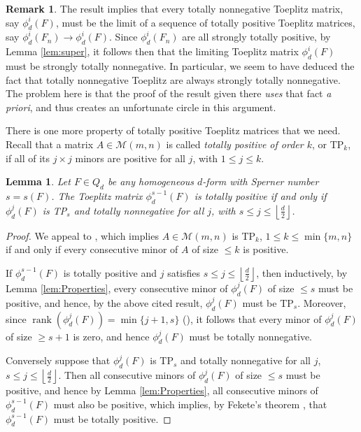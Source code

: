 \documentclass[unnumsec,webpdf,modern,medium]{oup-authoring-template}
\newcommand{\flo}[1]{\left\lfloor\frac{#1}{2}\right\rfloor}
\theoremstyle{theorem}
\newtheorem{lemma}[theorem]{Lemma}
\theoremstyle{definition}
\newtheorem{remark}[theorem]{Remark}
\begin{document}
\begin{remark}
	\label{rem:STNN}
	The result \cite[Theorem 2, Theorem 4.21]{MMS} implies that every totally nonnegative Toeplitz matrix, say $\phi^i_d(F)$, must be the limit of a sequence of totally positive Toeplitz matrices, say $\phi^i_d(F_n)\rightarrow \phi^i_d(F)$.  Since $\phi^i_d(F_n)$ are all strongly totally positive, by Lemma \ref{lem:super}, it follows then that the limiting Toeplitz matrix $\phi^i_d(F)$ must be strongly totally nonnegative.  In particular, we seem to have deduced the fact that totally nonnegative Toeplitz are always strongly totally nonnegative.  The problem here is that the proof of the result \cite[Theorem 2, Theorem 4.21]{MMS} given there \emph{uses} that fact \emph{a priori}, and thus creates an unfortunate circle in this argument.  
\end{remark}
There is one more property of totally positive Toeplitz matrices that we need.  Recall that a matrix $A\in\mathcal{M}(m,n)$ is called \emph{totally positive of order $k$}, or TP$_k$, 
if all of its $j\times j$ minors are positive for all \(j\), with $1\leq j\leq k$. 
	\begin{lemma}
		\label{lem:TPs}
		Let $F\in Q_d$ be any homogeneous $d$-form with Sperner number $s=s(F)$.
		The Toeplitz matrix $\phi^{s-1}_d(F)$ is totally positive if and only if $\phi^j_d(F)$ is TP$_s$ and totally nonnegative for all 
		\(j\), with $s\leq j\leq \flo{d}$. 
	\end{lemma}
	\begin{proof}
	We appeal to \cite[Corollary 3.1.7]{FJ}, which implies $A\in\mathcal{M}(m,n)$ is TP$_k$, $1\leq k\leq \min\{m,n\}$ if and only if every consecutive minor of $A$ of size $\leq k$ is positive.  
	
	If $\phi^{s-1}_d(F)$ is totally positive and $j$ satisfies $s\leq j\leq \flo{d}$, then inductively, by Lemma \ref{lem:Properties}, every consecutive minor of $\phi^j_d(F)$ of size $\leq s$ must be positive, and hence, by the above cited result, $\phi^j_d(F)$ must be TP$_s$.  Moreover, since $\operatorname{rank}(\phi^j_d(F))=\min\{j+1,s\}$ (\cite[Lemma 4.5]{MMS}), it follows that every minor of $\phi^j_d(F)$ of size $\geq s+1$ is zero, and hence $\phi^j_d(F)$ must be totally nonnegative.
	
	Conversely suppose that $\phi^j_d(F)$ is TP$_s$ and totally nonnegative for all $j$, $s\leq j\leq \flo{d}$.  Then all consecutive minors of $\phi^j_d(F)$ of size $\leq s$ must be positive, and hence by Lemma \ref{lem:Properties}, all consecutive minors of $\phi^{s-1}_d(F)$ must also be positive, which implies, by Fekete's theorem \cite[Fact 4.6]{MMS}, that $\phi^{s-1}_d(F)$ must be totally positive.
\end{proof}
	
\end{document}
